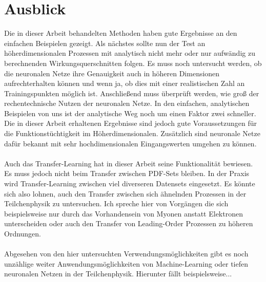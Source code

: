 \section{Ausblick}
Die in dieser Arbeit behandelten Methoden haben gute Ergebnisse an den einfachen Beispielen gezeigt. Als nächstes sollte nun der Test an höherdimensionalen Prozessen mit analytisch nicht mehr oder nur aufwändig zu berechnenden Wirkungsquerschnitten folgen. Es muss noch untersucht werden, ob die neuronalen Netze ihre Genauigkeit auch in höheren Dimensionen aufrechterhalten können und wenn ja, ob dies mit einer realistischen Zahl an Trainingspunkten möglich ist. Anschließend muss überprüft werden, wie groß der rechentechnische Nutzen der neuronalen Netze. In den einfachen, analytischen Beispielen von uns ist der analytische Weg noch um einen Faktor zwei schneller. Die in dieser Arbeit erhaltenen Ergebnisse sind jedoch gute Voraussetzungen für die Funktionstüchtigkeit im Höherdimensionalen. Zusätzlich sind neuronale Netze dafür bekannt mit sehr hochdimensionalen Eingangswerten umgehen zu können. \\
\\
Auch das Transfer-Learning hat in dieser Arbeit seine Funktionalität bewiesen. Es muss jedoch nicht beim Transfer zwischen PDF-Sets bleiben. In der Praxis wird Transfer-Learning zwischen viel diverseren Datensets eingesetzt. Es könnte sich also lohnen, auch den Transfer zwischen sich ähnelnden Prozessen in der Teilchenphysik zu untersuchen. Ich spreche hier von Vorgängen die sich beispielsweise nur durch das Vorhandensein von Myonen anstatt Elektronen unterscheiden oder auch den Transfer von Leading-Order Prozessen zu höheren Ordnungen. \\
\\
Abgesehen von den hier untersuchten Verwendungsmöglichkeiten gibt es noch unzählige weiter Anwendungsmöglichkeiten von Machine-Learning oder tiefen neuronalen Netzen in der Teilchenphysik. Hierunter fällt beispielsweise... 
\appendix
